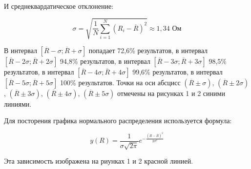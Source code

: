 \documentclass[a4paper, 12pt]{article}
\begin{document}
И среднеквардатическое отклонение:

\begin{equation}
    \sigma=\sqrt{\frac{1}{N}\sum_{i=1}^N(R_i-\overline{R})^2} \approx 1,34\text{ Ом}
\end{equation}

В интервал $[\overline{R}-\sigma; \overline{R}+\sigma]$ попадает 72,6\% результатов, в интервал $[\overline{R}-2\sigma; \overline{R}+2\sigma]$ 94,8\% результатов, в интервал $[\overline{R}-3\sigma; \overline{R}+3\sigma]$ 98,5\% результатов, в интервал $[\overline{R}-4\sigma; \overline{R}+4\sigma]$ 99,6\% результатов, в интервал $[\overline{R}-5\sigma; \overline{R}+5\sigma]$ 100\% результатов. Точки на оси абсцисс $(\overline{R} \pm \sigma)$, $(\overline{R} \pm 2\sigma)$, $(\overline{R} \pm 3\sigma)$, $(\overline{R} \pm 4\sigma)$, $(\overline{R} \pm 5\sigma)$ отмечены на рисунках 1 и 2 синими линиями.

Для посторения графика нормального распределения используется формула:

\begin{equation}
    y(R)=\frac{1}{\sigma\sqrt{2\pi}}e^{-\frac{(R-\overline{R})^2}{2\sigma^2}}
\end{equation}

Эта зависимость изображена на риунках 1 и 2 красной линией.
\end{document}
